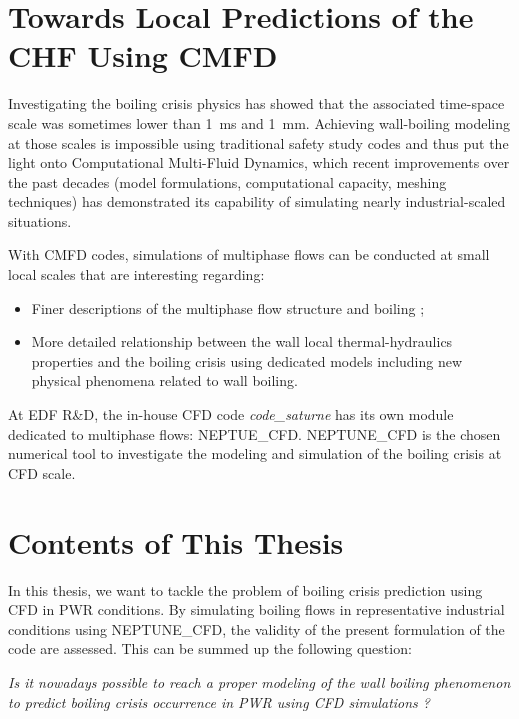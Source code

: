 \section{Towards Local Predictions of the CHF Using CMFD}

Investigating the boiling crisis physics has showed that the associated time-space scale was sometimes lower than 1\ ms and 1\ mm. Achieving wall-boiling modeling at those scales is impossible using traditional safety study codes and thus put the light onto Computational Multi-Fluid Dynamics, which recent improvements over the past decades (model formulations, computational capacity, meshing techniques) has demonstrated its capability of simulating nearly industrial-scaled situations.

\npar

With CMFD codes, simulations of multiphase flows can be conducted at small local scales that are interesting regarding:
\begin{itemize}
\item Finer descriptions of the multiphase flow structure and boiling ;\
\item More detailed relationship between the wall local thermal-hydraulics properties and the boiling crisis using dedicated models including new physical phenomena related to wall boiling.
\end{itemize} 

At EDF R\&D, the in-house CFD code \textit{code\_saturne} has its own module dedicated to multiphase flows: NEPTUE\_CFD. NEPTUNE\_CFD is the chosen numerical tool to investigate the modeling and simulation of the boiling crisis at CFD scale.


\section{Contents of This Thesis}

In this thesis, we want to tackle the problem of boiling crisis prediction using CFD in PWR conditions. By simulating boiling flows in representative industrial conditions using NEPTUNE\_CFD, the validity of the present formulation of the code are assessed. This can be summed up the following question:

\npar

\begin{center}
\textit{Is it nowadays possible to reach a proper modeling of the wall boiling phenomenon to predict boiling crisis occurrence in PWR using CFD simulations ?}
\end{center}

